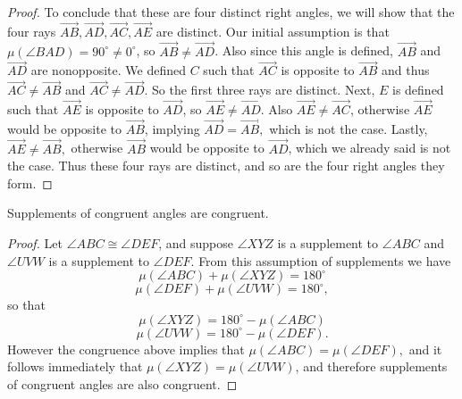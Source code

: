 \documentclass{article}
\newenvironment{problem1}[1]{\noindent {\bf Problem #1:}}
{\medskip}
\newcommand{\ray}[1]{\overrightarrow{#1}}
\renewcommand{\deg}{^{\circ}}
\begin{document}
\begin{proof}
To conclude that these are four distinct right angles, we will show that the four rays $\ray{AB},\ray{AD},\ray{AC},\ray{AE}$ are distinct. Our initial assumption is that $\mu(\angle{BAD})=90\deg\ne0\deg$, so $\ray{AB}\ne\ray{AD}$. Also since this angle is defined, $\ray{AB}$ and $\ray{AD}$ are nonopposite. We defined $C$ such that $\ray{AC}$ is opposite to $\ray{AB}$ and thus $\ray{AC}\ne\ray{AB}$ and $\ray{AC}\ne\ray{AD}.$ So the first three rays are distinct. Next, $E$ is defined such that $\ray{AE}$ is opposite to $\ray{AD}$, so $\ray{AE}\ne\ray{AD}$. Also $\ray{AE}\ne\ray{AC}$, otherwise $\ray{AE}$ would be opposite to $\ray{AB}$, implying $\ray{AD}=\ray{AB},$ which is not the case. Lastly, $\ray{AE}\ne\ray{AB},$ otherwise $\ray{AB}$ would be opposite to $\ray{AD}$, which we already said is not the case. Thus these four rays are distinct, and so are the four right angles they form.\end{proof}


\begin{problem1}{4} Supplements of congruent angles are congruent. \end{problem1}
\begin{proof} Let $\angle{ABC}\cong\angle{DEF}$, and suppose $\angle{XYZ}$ is a supplement to $\angle{ABC}$ and $\angle{UVW}$ is a supplement to $\angle{DEF}$. From this assumption of supplements we have $$\mu(\angle{ABC})+\mu(\angle{XYZ})=180\deg$$ $$\mu(\angle{DEF})+\mu(\angle{UVW})=180\deg,$$ so that $$\mu(\angle{XYZ})=180\deg-\mu(\angle{ABC})$$ $$\mu(\angle{UVW})=180\deg-\mu(\angle{DEF}).$$ However the congruence above implies that $\mu(\angle{ABC})=\mu(\angle{DEF}),$ and it follows immediately that $\mu(\angle{XYZ})=\mu(\angle{UVW})$, and therefore supplements of congruent angles are also congruent.
\end{proof}
\end{document}
